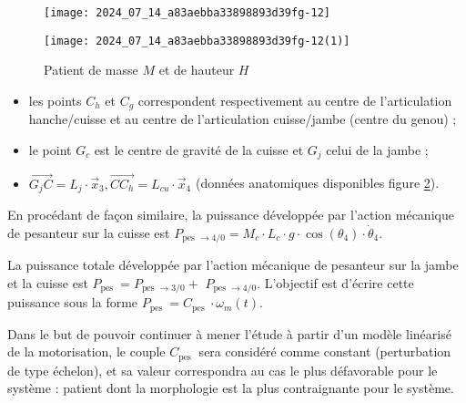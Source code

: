 \begin{figure}[!h]\centering
\texttt{[image: 2024\_07\_14\_a83aebba33898893d39fg-12]}

\caption{\label{fig:ccs_mp_2024:fig:19}}
\end{figure}
\begin{figure}[!h]\centering
\texttt{[image: 2024\_07\_14\_a83aebba33898893d39fg-12(1)]}

\caption{\label{fig:ccs_mp_2024:fig:20}Patient de masse $M$ et de hauteur $H$}
\end{figure}
\begin{itemize}
  \item les points $C_{h}$ et $C_{g}$ correspondent respectivement au centre de l'articulation hanche/cuisse et au centre de l'articulation cuisse/jambe (centre du genou) ;

  \item le point $G_{c}$ est le centre de gravité de la cuisse et $G_{j}$ celui de la jambe ;

  \item $\overrightarrow{G_{j} C}=L_{j} \cdot \vec{x}_{3}, \overrightarrow{C C_{h}}=L_{c u} \cdot \vec{x}_{4}$ (données anatomiques disponibles figure \ref{fig:ccs_mp_2024:fig:20}).

\end{itemize}



En procédant de façon similaire, la puissance développée par l'action mécanique de pesanteur sur la cuisse est $P_{\text {pes } \rightarrow 4 / 0}=M_{c} \cdot L_{c} \cdot g \cdot \cos \left(\theta_{4}\right) \cdot \dot{\theta}_{4}$.

La puissance totale développée par l'action mécanique de pesanteur sur la jambe et la cuisse est $P_{\text {pes }}=P_{\text {pes } \rightarrow 3 / 0}+$ $P_{\text {pes } \rightarrow 4 / 0}$. L'objectif est d'écrire cette puissance sous la forme $P_{\text {pes }}=C_{\text {pes }} \cdot \omega_{m}(t)$.

Dans le but de pouvoir continuer à mener l'étude à partir d'un modèle linéarisé de la motorisation, le couple $C_{\text {pes }}$ sera considéré comme constant (perturbation de type échelon), et sa valeur correspondra au cas le plus défavorable pour le système : patient dont la morphologie est la plus contraignante pour le système.

